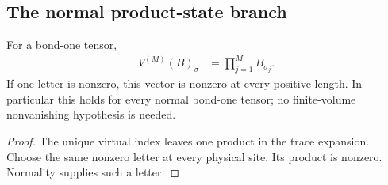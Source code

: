 \subsection{The normal product-state branch}
\label{sec:spwc_product_finite_prefix}

\begin{lemma}
    \label{lem:spwc_bond_one_all_volume_nonvanishing}
    \leanok
    For a bond-one tensor,
    \begin{align}
        V^{(M)}(B)_\sigma & =\prod_{j=1}^M B_{\sigma_j}.
        \label{eq:spwc_bond_one_product_vector}
    \end{align}
    If one letter is nonzero, this vector is nonzero at every positive
    length. In particular this holds for every normal bond-one tensor;
    no finite-volume nonvanishing hypothesis is needed.
\end{lemma}
\begin{proof}\leanok
    The unique virtual index leaves one product in the trace expansion.
    Choose the same nonzero letter at every physical site. Its product
    is nonzero. Normality supplies such a letter.
\end{proof}


